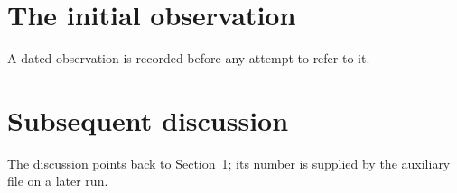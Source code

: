 \documentclass{article}
\begin{document}
\section{The initial observation}\label{sec:observation}
A dated observation is recorded before any attempt to refer to it.

\section{Subsequent discussion}
The discussion points back to Section~\ref{sec:observation}; its number is supplied by the auxiliary file on a later run.
\end{document}
